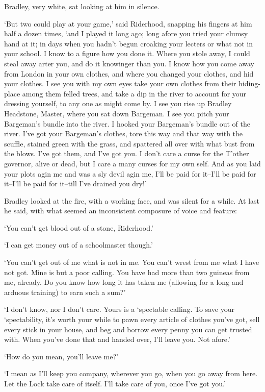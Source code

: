 Bradley, very white, sat looking at him in silence.

‘But two could play at your game,’ said Riderhood, snapping his fingers
at him half a dozen times, ‘and I played it long ago; long afore you
tried your clumsy hand at it; in days when you hadn’t begun croaking
your lecters or what not in your school. I know to a figure how you
done it. Where you stole away, I could steal away arter you, and do it
knowinger than you. I know how you come away from London in your own
clothes, and where you changed your clothes, and hid your clothes. I see
you with my own eyes take your own clothes from their hiding-place
among them felled trees, and take a dip in the river to account for
your dressing yourself, to any one as might come by. I see you rise up
Bradley Headstone, Master, where you sat down Bargeman. I see you pitch
your Bargeman’s bundle into the river. I hooked your Bargeman’s bundle
out of the river. I’ve got your Bargeman’s clothes, tore this way and
that way with the scuffle, stained green with the grass, and spattered
all over with what bust from the blows. I’ve got them, and I’ve got you.
I don’t care a curse for the T’other governor, alive or dead, but I care
a many curses for my own self. And as you laid your plots agin me and
was a sly devil agin me, I’ll be paid for it--I’ll be paid for it--I’ll
be paid for it--till I’ve drained you dry!’

Bradley looked at the fire, with a working face, and was silent for a
while. At last he said, with what seemed an inconsistent composure of
voice and feature:

‘You can’t get blood out of a stone, Riderhood.’

‘I can get money out of a schoolmaster though.’

‘You can’t get out of me what is not in me. You can’t wrest from me what
I have not got. Mine is but a poor calling. You have had more than two
guineas from me, already. Do you know how long it has taken me (allowing
for a long and arduous training) to earn such a sum?’

‘I don’t know, nor I don’t care. Yours is a ‘spectable calling. To
save your ‘spectability, it’s worth your while to pawn every article of
clothes you’ve got, sell every stick in your house, and beg and borrow
every penny you can get trusted with. When you’ve done that and handed
over, I’ll leave you. Not afore.’

‘How do you mean, you’ll leave me?’

‘I mean as I’ll keep you company, wherever you go, when you go away from
here. Let the Lock take care of itself. I’ll take care of you, once I’ve
got you.’

